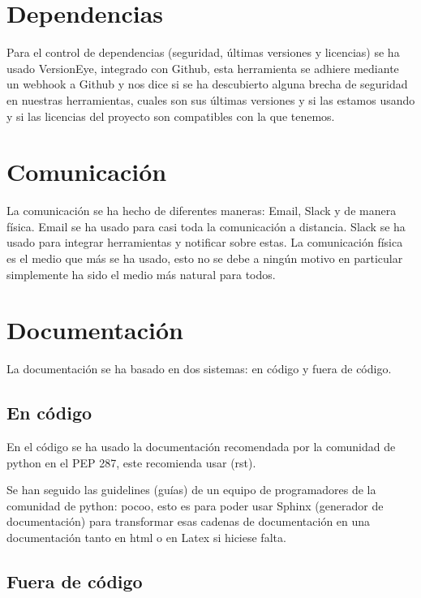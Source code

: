 \section{Dependencias}

Para el control de dependencias (seguridad, últimas versiones y licencias) se ha usado VersionEye, integrado con Github, esta herramienta se adhiere mediante un webhook a Github y nos dice si se ha descubierto alguna brecha de seguridad en nuestras herramientas, cuales son sus últimas versiones y si las estamos usando y si las licencias del proyecto son compatibles con la que tenemos.


\section{Comunicación}

La comunicación se ha hecho de diferentes maneras: Email, Slack y de manera física. Email se ha usado para casi toda la comunicación a distancia. Slack se ha usado para integrar herramientas y notificar sobre estas. La comunicación física es el medio que más se ha usado, esto no se debe a ningún motivo en particular simplemente ha sido el medio más natural para todos.


\section{Documentación}

La documentación se ha basado en dos sistemas: en código y fuera de código. 

\subsection{En código}

En el código se ha usado la documentación recomendada por la comunidad de python en el PEP 287\cite{pep287}, este recomienda usar  (rst).

Se han seguido las guidelines (guías) de un equipo de programadores de la comunidad de python: pocoo\cite{pocoo}, esto es para poder usar Sphinx (generador de documentación) para transformar esas cadenas de documentación en una documentación tanto en html o en Latex si hiciese falta.

\subsection{Fuera de código}

